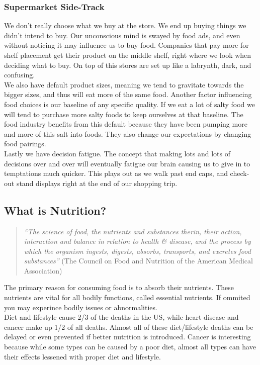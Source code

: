 \documentclass[letterpaper, 11pt]{article}
\begin{document}
\subsubsection{Supermarket Side-Track}
\label{sec:org0100681}
We don't really choose what we buy at the store. We end up buying things we didn't intend to buy. Our unconscious mind is swayed by food ads, and even without noticing it may influence us to buy food. Companies that pay more for shelf placement get their product on the middle shelf, right where we look when deciding what to buy. On top of this stores are set up like a labrynth, dark, and confusing.\\
We also have default product sizes, meaning we tend to gravitate towards the bigger sizes, and thus will eat more of the same food. Another factor influencing food choices is our baseline of any specific quality. If we eat a lot of salty food we will tend to purchase more salty foods to keep ourselves at that baseline. The food industry benefits from this default because they have been pumping more and more of this salt into foods. They also change our expectations by changing food pairings.\\
Lastly we have decision fatigue. The concept that making lots and lots of decisions over and over will eventually fatigue our brain causing us to give in to temptations much quicker. This plays out as we walk past end caps, and check-out stand displays right at the end of our shopping trip.\\
\subsection{What is Nutrition?}
\label{sec:org11393fd}
\begin{quote}
\emph{``The science of food, the nutrients and substances therin, their action, interaction and balance in relation to health \& disease, and the process by which the organism ingests, digests, absorbs, transports, and excretes food substances''} (The Council on Food and Nutrition of the American Medical Association)\\
\end{quote}
The primary reason for consuming food is to absorb their nutrients. These nutrients are vital for all bodily functions, called essential nutrients. If ommited you may experince bodily issues or abnormalities.\\
Diet and lifestyle cause 2/3 of the deaths in the US, while heart disease and cancer make up 1/2 of all deaths. Almost all of these diet/lifestyle deaths can be delayed or even prevented if better nutrition is introduced. Cancer is interesting because while some types can be caused by a poor diet, almost all types can have their effects lessened with proper diet and lifestyle.\\
\end{document}
